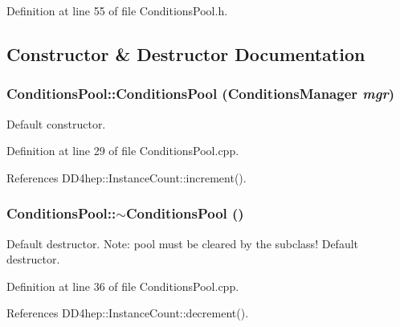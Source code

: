 Definition at line 55 of file ConditionsPool.h.

\subsection{Constructor \& Destructor Documentation}
\hypertarget{class_d_d4hep_1_1_conditions_1_1_conditions_pool_a4aec4f20a1422387f1814fdcb75f66c1}{
\subsubsection[{ConditionsPool}]{\setlength{\rightskip}{0pt plus 5cm}ConditionsPool::ConditionsPool ({\bf ConditionsManager} {\em mgr})}}
\label{class_d_d4hep_1_1_conditions_1_1_conditions_pool_a4aec4f20a1422387f1814fdcb75f66c1}


Default constructor. 

Definition at line 29 of file ConditionsPool.cpp.

References DD4hep::InstanceCount::increment().\hypertarget{class_d_d4hep_1_1_conditions_1_1_conditions_pool_a33a9ee6f763731cf1fd02b8a102b5217}{
\subsubsection[{$\sim$ConditionsPool}]{\setlength{\rightskip}{0pt plus 5cm}ConditionsPool::$\sim$ConditionsPool ()}}
\label{class_d_d4hep_1_1_conditions_1_1_conditions_pool_a33a9ee6f763731cf1fd02b8a102b5217}


Default destructor. Note: pool must be cleared by the subclass! Default destructor. 

Definition at line 36 of file ConditionsPool.cpp.

References DD4hep::InstanceCount::decrement().

